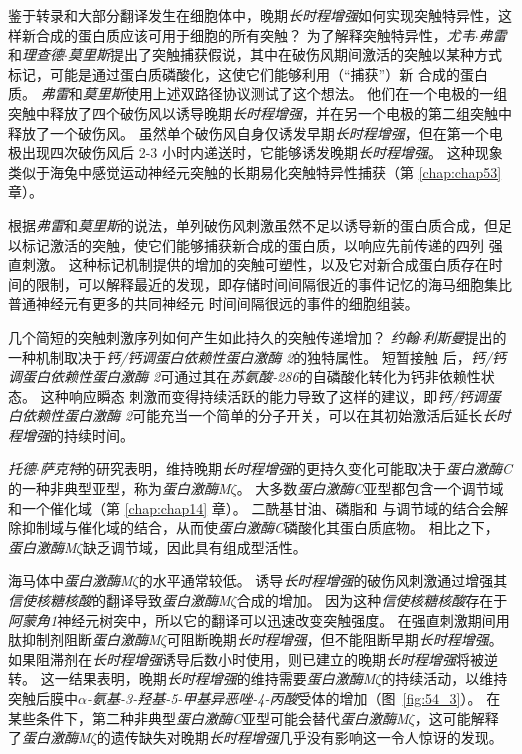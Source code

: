 鉴于转录和大部分翻译发生在细胞体中，晚期\textit{长时程增强}如何实现突触特异性，这样新合成的蛋白质应该可用于细胞的所有突触？
为了解释突触特异性，\textit{尤韦$\cdot$弗雷}和\textit{理查德$\cdot$莫里斯}提出了突触捕获假说，其中在破伤风期间激活的突触以某种方式标记，可能是通过蛋白质磷酸化，这使它们能够利用（“捕获”）新 合成的蛋白质。
\textit{弗雷}和\textit{莫里斯}使用上述双路径协议测试了这个想法。
他们在一个电极的一组突触中释放了四个破伤风以诱导晚期\textit{长时程增强}，并在另一个电极的第二组突触中释放了一个破伤风。
虽然单个破伤风自身仅诱发早期\textit{长时程增强}，但在第一个电极出现四次破伤风后 2-3 小时内递送时，它能够诱发晚期\textit{长时程增强}。
这种现象类似于海兔中感觉运动神经元突触的长期易化突触特异性捕获（第 \ref{chap:chap53} 章）。


根据\textit{弗雷}和\textit{莫里斯}的说法，单列破伤风刺激虽然不足以诱导新的蛋白质合成，但足以标记激活的突触，使它们能够捕获新合成的蛋白质，以响应先前传递的四列 强直刺激。
这种标记机制提供的增加的突触可塑性，以及它对新合成蛋白质存在时间的限制，可以解释最近的发现，即存储时间间隔很近的事件记忆的海马细胞集比普通神经元有更多的共同神经元 时间间隔很远的事件的细胞组装。


几个简短的突触刺激序列如何产生如此持久的突触传递增加？
\textit{约翰$\cdot$利斯曼}提出的一种机制取决于\textit{钙/钙调蛋白依赖性蛋白激酶 2}的独特属性。
短暂接触  后，\textit{钙/钙调蛋白依赖性蛋白激酶 2}可通过其在\textit{苏氨酸-286}的自磷酸化转化为钙非依赖性状态。
这种响应瞬态  刺激而变得持续活跃的能力导致了这样的建议，即\textit{钙/钙调蛋白依赖性蛋白激酶 2}可能充当一个简单的分子开关，可以在其初始激活后延长\textit{长时程增强}的持续时间。


\textit{托德$\cdot$萨克特}的研究表明，维持晚期\textit{长时程增强}的更持久变化可能取决于\textit{蛋白激酶C}的一种非典型亚型，称为\textit{蛋白激酶M$\zeta$}。
大多数\textit{蛋白激酶C}亚型都包含一个调节域和一个催化域（第 \ref{chap:chap14} 章）。
二酰基甘油、磷脂和  与调节域的结合会解除抑制域与催化域的结合，从而使\textit{蛋白激酶C}磷酸化其蛋白质底物。
相比之下，\textit{蛋白激酶M$\zeta$}缺乏调节域，因此具有组成型活性。


海马体中\textit{蛋白激酶M$\zeta$}的水平通常较低。
诱导\textit{长时程增强}的破伤风刺激通过增强其\textit{信使核糖核酸}的翻译导致\textit{蛋白激酶M$\zeta$}合成的增加。
因为这种\textit{信使核糖核酸}存在于\textit{阿蒙角1}神经元树突中，所以它的翻译可以迅速改变突触强度。
在强直刺激期间用肽抑制剂阻断\textit{蛋白激酶M$\zeta$}可阻断晚期\textit{长时程增强}，但不能阻断早期\textit{长时程增强}。
如果阻滞剂在\textit{长时程增强}诱导后数小时使用，则已建立的晚期\textit{长时程增强}将被逆转。
这一结果表明，晚期\textit{长时程增强}的维持需要\textit{蛋白激酶M$\zeta$}的持续活动，以维持突触后膜中\textit{$\alpha$-氨基-3-羟基-5-甲基异恶唑-4-丙酸}受体的增加（图~\ref{fig:54_3}）。
在某些条件下，第二种非典型\textit{蛋白激酶C}亚型可能会替代\textit{蛋白激酶M$\zeta$}，这可能解释了\textit{蛋白激酶M$\zeta$}的遗传缺失对晚期\textit{长时程增强}几乎没有影响这一令人惊讶的发现。


